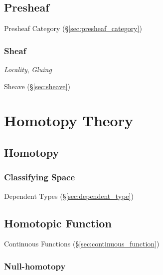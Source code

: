 \subsection{Presheaf}\label{sec:presheaf}

Presheaf Category (\S\ref{sec:presheaf_category})



\subsubsection{Sheaf}\label{sec:sheaf}

\emph{Locality}, \emph{Gluing}

Sheave (\S\ref{sec:sheave})



\section{Homotopy Theory}\label{sec:homotopy_theory}

\subsection{Homotopy}\label{sec:homotopy}

\subsubsection{Classifying Space}\label{sec:classifying_space}

Dependent Types (\S\ref{sec:dependent_type})



\subsection{Homotopic Function}\label{sec:homotopic_function}

Continuous Functions (\S\ref{sec:continuous_function})



\subsubsection{Null-homotopy}\label{sec:null_homotopy}

